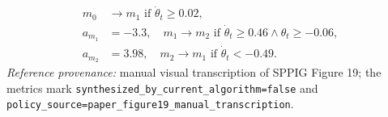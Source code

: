 \[
  \begin{aligned}
    m_0 &\to m_1 \text{ if } \dot{\theta}_t \ge 0.02,\\
    a_{m_1} &= -3.3,\quad m_1 \to m_2 \text{ if } \dot{\theta}_t \ge 0.46 \wedge \theta_t \ge -0.06,\\
    a_{m_2} &= 3.98,\quad m_2 \to m_1 \text{ if } \dot{\theta}_t < -0.49.
  \end{aligned}
\]
\noindent\emph{Reference provenance:} manual visual transcription of SPPIG Figure 19; the metrics mark \texttt{synthesized\_by\_current\_algorithm=false} and \texttt{policy\_source=paper\_figure19\_manual\_transcription}.
